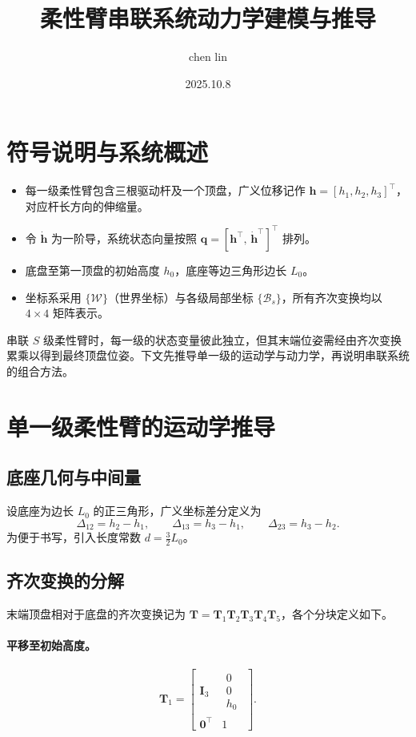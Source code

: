 \documentclass[12pt,a4paper]{article}
\title{柔性臂串联系统动力学建模与推导}
\author{chen lin}
\date{2025.10.8}
\begin{document}
\maketitle

\tableofcontents

\clearpage

\section{符号说明与系统概述}
\begin{itemize}
  \item 每一级柔性臂包含三根驱动杆及一个顶盘，广义位移记作 $\bm h = [h_1, h_2, h_3]^\top$，对应杆长方向的伸缩量。
  \item 令 $\dot{\bm h}$ 为一阶导，系统状态向量按照 $\bm q = [\bm h^\top,\, \dot{\bm h}^\top]^\top$ 排列。
  \item 底盘至第一顶盘的初始高度 $h_0$，底座等边三角形边长 $L_0$。
  \item 坐标系采用 $\{\mathcal{W}\}$（世界坐标）与各级局部坐标 $\{\mathcal{B}_s\}$，所有齐次变换均以 $4 \times 4$ 矩阵表示。
\end{itemize}

串联 $S$ 级柔性臂时，每一级的状态变量彼此独立，但其末端位姿需经由齐次变换累乘以得到最终顶盘位姿。下文先推导单一级的运动学与动力学，再说明串联系统的组合方法。

\section{单一级柔性臂的运动学推导}
\subsection{底座几何与中间量}
设底座为边长 $L_0$ 的正三角形，广义坐标差分定义为
\begin{equation}
  \Delta_{12} = h_2 - h_1,\qquad \Delta_{13} = h_3 - h_1,\qquad \Delta_{23} = h_3 - h_2.
\end{equation}
为便于书写，引入长度常数 $d = \frac{3}{2}L_0$。

\subsection{齐次变换的分解}
末端顶盘相对于底盘的齐次变换记为 $\bm T = \bm T_1\bm T_2\bm T_3\bm T_4\bm T_5$，各个分块定义如下。

\paragraph{平移至初始高度。} 
\begin{equation}
  \bm T_1 = \begin{bmatrix}
    \bm I_3 & \begin{matrix}0\\0\\h_0\end{matrix} \\
    \bm 0^\top & 1
  \end{bmatrix}.
\end{equation}
\end{document}
